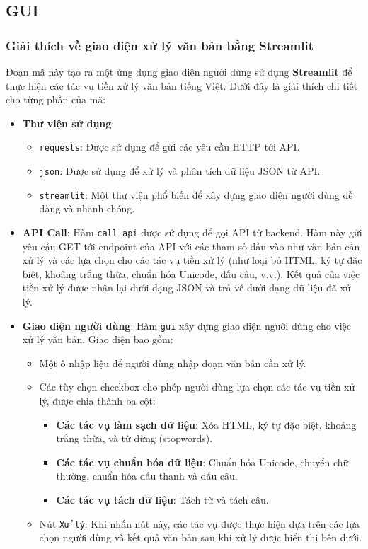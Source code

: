 \subsection{GUI}
\subsubsection{Giải thích về giao diện xử lý văn bản bằng Streamlit}

Đoạn mã này tạo ra một ứng dụng giao diện người dùng sử dụng \textbf{Streamlit} để thực hiện các tác vụ tiền xử lý văn bản tiếng Việt. Dưới đây là giải thích chi tiết cho từng phần của mã:

\begin{itemize}
    \item \textbf{Thư viện sử dụng}:
    \begin{itemize}
        \item \texttt{requests}: Được sử dụng để gửi các yêu cầu HTTP tới API.
        \item \texttt{json}: Được sử dụng để xử lý và phân tích dữ liệu JSON từ API.
        \item \texttt{streamlit}: Một thư viện phổ biến để xây dựng giao diện người dùng dễ dàng và nhanh chóng.
    \end{itemize}

    \item \textbf{API Call}:
    Hàm \texttt{call\_api} được sử dụng để gọi API từ backend. Hàm này gửi yêu cầu GET tới endpoint của API với các tham số đầu vào như văn bản cần xử lý và các lựa chọn cho các tác vụ tiền xử lý (như loại bỏ HTML, ký tự đặc biệt, khoảng trắng thừa, chuẩn hóa Unicode, dấu câu, v.v.). 
    Kết quả của việc tiền xử lý được nhận lại dưới dạng JSON và trả về dưới dạng dữ liệu đã xử lý.

    \item \textbf{Giao diện người dùng}:
    Hàm \texttt{gui} xây dựng giao diện người dùng cho việc xử lý văn bản. Giao diện bao gồm:
    \begin{itemize}
        \item Một ô nhập liệu để người dùng nhập đoạn văn bản cần xử lý.
        \item Các tùy chọn checkbox cho phép người dùng lựa chọn các tác vụ tiền xử lý, được chia thành ba cột:
        \begin{itemize}
            \item \textbf{Các tác vụ làm sạch dữ liệu}: Xóa HTML, ký tự đặc biệt, khoảng trắng thừa, và từ dừng (stopwords).
            \item \textbf{Các tác vụ chuẩn hóa dữ liệu}: Chuẩn hóa Unicode, chuyển chữ thường, chuẩn hóa dấu thanh và dấu câu.
            \item \textbf{Các tác vụ tách dữ liệu}: Tách từ và tách câu.
        \end{itemize}
        \item Nút \texttt{Xử lý}: Khi nhấn nút này, các tác vụ được thực hiện dựa trên các lựa chọn người dùng và kết quả văn bản sau khi xử lý được hiển thị bên dưới.
    \end{itemize}


\end{itemize}
